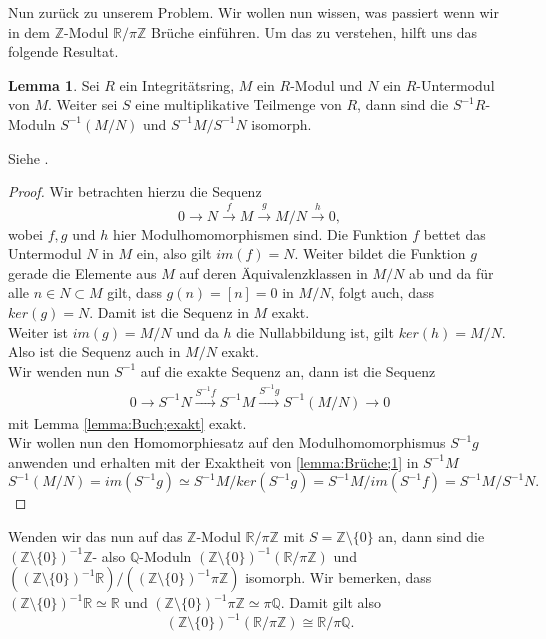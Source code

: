 \documentclass[11pt,titlepage]{article}
\newcommand{\setZ}{\mathbb{Z}}
\newcommand{\setQ}{\mathbb{Q}}
\newcommand{\setR}{\mathbb{R}}
\theoremstyle{definition}
\newtheorem{lemma}[theorem]{Lemma}
\theoremstyle{remark}
\begin{document}
	Nun zurück zu unserem Problem. Wir wollen nun wissen, was passiert wenn 
	wir in dem $\setZ$-Modul $\setR /\pi\setZ$ Brüche einführen. Um das 
	zu verstehen, hilft uns das folgende Resultat.
	
	\begin{lemma}
		Sei $R$ ein Integritätsring, $M$ ein $R$-Modul und 
		$N$ ein $R$-Untermodul von $M$. Weiter sei $S$ eine multiplikative 
		Teilmenge von $R$, dann sind die $S^{-1}R$-Moduln $S^{-1}(M/N)$ und 
		$S^{-1}M/S^{-1}N$ isomorph.
	\end{lemma}
	
	Siehe \cite[Korollar 3.4 (iii)]{introductiontocomalg}.
	
	\begin{proof}
		Wir betrachten hierzu die Sequenz
		\[0\to N\xrightarrow{f} M\xrightarrow{g} M/N\xrightarrow{h} 0,\]
		wobei $f,g$ und $h$ hier Modulhomomorphismen sind. Die Funktion 
		$f$ bettet das Untermodul $N$ in $M$ ein, also gilt 
		$im(f)=N$. Weiter bildet die Funktion $g$ gerade die Elemente aus $M$ 
		auf deren Äquivalenzklassen in $M/N$ ab und da für alle $n\in N\subset M$ 
		gilt, dass $g(n)=[n]=0$ in $M/N$, folgt auch, dass $ker(g)=N$. Damit 
		ist die Sequenz in $M$ exakt. \\
		Weiter ist $im(g)=M/N$ und da $h$ die Nullabbildung ist, gilt $ker(h)=M/N$. 
		Also ist die Sequenz auch in $M/N$ exakt. \\
		Wir wenden nun $S^{-1}$ auf die exakte Sequenz an, dann ist die Sequenz
		\begin{align}
			0\to S^{-1}N \xrightarrow{S^{-1}f} S^{-1}M \xrightarrow{S^{-1}g}
			S^{-1}(M/N)\to 0 \label{lemma:Brüche;1}
		\end{align}
		mit Lemma \ref{lemma:Buch;exakt} exakt. \\
		Wir wollen nun den Homomorphiesatz auf den Modulhomomorphismus 
		$S^{-1}g$ anwenden und erhalten mit der Exaktheit von \ref{lemma:Brüche;1} 
		in $S^{-1}M$
		\[ S^{-1}(M/N)=im(S^{-1}g)\simeq S^{-1}M/ker(S^{-1}g) =S^{-1}M/im(S^{-1}f)=S^{-1}M/S^{-1}N.\]
	\end{proof}
	
	Wenden wir das nun auf das $\setZ$-Modul $\setR /\pi\setZ$ mit 
	$S=\setZ\setminus\{0\}$ an, dann sind die $(\setZ\setminus\{0\})^{-1}\setZ$- also $\setQ$-Moduln 
	$(\setZ\setminus\{0\})^{-1}(\setR /\pi\setZ)$ und 
	$\left((\setZ\setminus\{0\})^{-1}\setR\right) /\left((\setZ\setminus\{0\})^{-1}\pi\setZ\right)$ 
	isomorph. Wir bemerken, dass $(\setZ\setminus\{0\})^{-1}\setR\simeq\setR$ und 
	$(\setZ\setminus\{0\})^{-1}\pi\setZ\simeq\pi\setQ$. Damit gilt also 
	\[ (\setZ\setminus\{0\})^{-1}(\setR /\pi\setZ)\cong \setR/\pi\setQ.\]
	
\end{document}
